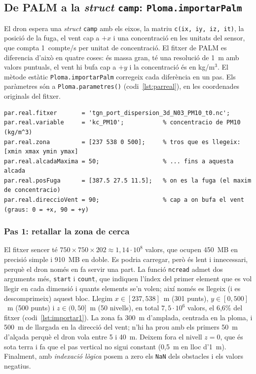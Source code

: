 \documentclass[11pt,a4paper]{article}
\begin{document}
\subsection{De PALM a la \emph{struct} \texttt{camp}: \texttt{Ploma.importarPalm}}
\label{sec:importar}

El dron espera una \emph{struct} \texttt{camp} amb els eixos, la matriu \texttt{c(ix, iy, iz, it)}, la posició de la fuga, el vent cap a $+x$ i una concentració en les unitats del sensor, que compta 1~compte/s per unitat de concentració. El fitxer de PALM es diferencia d'això en quatre coses: és massa gran, té una resolució de 1~m amb valors puntuals, el vent hi bufa cap a $+y$ i la concentració és en kg/m$^3$. El mètode estàtic \texttt{Ploma.importarPalm} corregeix cada diferència en un pas. Els paràmetres són a \texttt{Ploma.parametres()} (codi~\ref{lst:parreal}), en les coordenades originals del fitxer.

\begin{lstlisting}[caption={Paràmetres de la ploma real (part de \texttt{Ploma.parametres}).}, label=lst:parreal]
% Ploma real (simulacio PALM). Posicions en metres, en les coordenades del fitxer.
par.real.fitxer       = 'tgn_port_dispersion_3d_N03_PM10_t0.nc';
par.real.variable     = 'kc_PM10';           % concentracio de PM10 (kg/m^3)
par.real.zona         = [237 538 0 500];     % tros que es llegeix: [xmin xmax ymin ymax]
par.real.alcadaMaxima = 50;                  % ... fins a aquesta alcada
par.real.posFuga      = [387.5 27.5 11.5];   % on es la fuga (el maxim de concentracio)
par.real.direccioVent = 90;                  % cap a on bufa el vent (graus: 0 = +x, 90 = +y)
\end{lstlisting}

\subsubsection*{Pas 1: retallar la zona de cerca}

El fitxer sencer té $750 \times 750 \times 202 \approx 1{,}14 \cdot 10^8$ valors, que ocupen 450~MB en precisió simple i 910~MB en doble. Es podria carregar, però és lent i innecessari, perquè el dron només en fa servir una part. La funció \texttt{ncread} admet dos arguments més, \texttt{start} i \texttt{count}, que indiquen l'índex del primer element que es vol llegir en cada dimensió i quants elements se'n volen; així només es llegeix (i es descomprimeix) aquest bloc. Llegim $x \in [237, 538]$~m (301 punts), $y \in [0, 500]$~m (500 punts) i $z \in (0, 50]$~m (50 nivells), en total $7{,}5 \cdot 10^6$ valors, el 6,6\% del fitxer (codi~\ref{lst:importar1}). La zona fa 300~m d'amplada, centrada en la ploma, i 500~m de llargada en la direcció del vent; n'hi ha prou amb els primers 50~m d'alçada perquè el dron vola entre 5 i 40~m. Deixem fora el nivell $z = 0$, que és sota terra i fa que el pas vertical no sigui constant (0,5~m en lloc d'1~m). Finalment, amb \emph{indexació lògica} posem a zero els \texttt{NaN} dels obstacles i els valors negatius.
\end{document}
